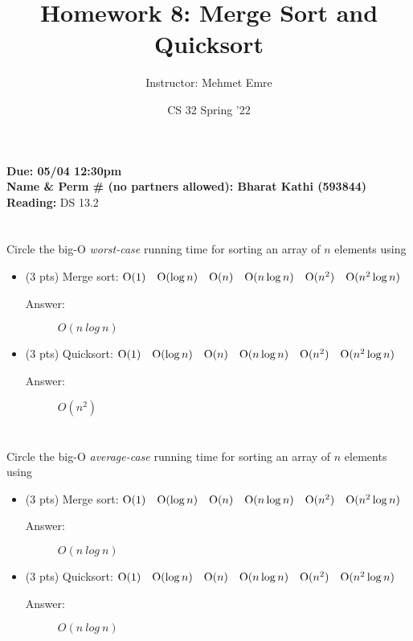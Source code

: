 \documentclass[11pt]{article}
\author{Instructor: Mehmet Emre}
\date{CS 32 Spring '22}
\title{Homework 8: Merge Sort and Quicksort}
\begin{document}
\maketitle
\textbf{Due: 05/04 12:30pm} \\ 
\vspace{1em}
\textbf{Name \& Perm \# (no partners allowed): Bharat Kathi (593844)} \\ 
\vspace{1em}
\textbf{Reading:} DS 13.2

\section{}
\label{sec:org453d831}
Circle the big-O \emph{worst-case} running time for sorting an array of \(n\)
elements using
\begin{itemize}
\item (3 pts) Merge sort: \(\mathrm{O}(1) \quad \mathrm{O}(\log n) \quad \mathrm{O}(n) \quad \mathrm{O}(n \log n) \quad \mathrm{O}(n^2) \quad \mathrm{O}(n^2 \log n)\)
\begin{description}
    \item[Answer:] $O(n~log~n)$
\end{description}
\item (3 pts) Quicksort: \(\mathrm{O}(1) \quad \mathrm{O}(\log n) \quad \mathrm{O}(n) \quad \mathrm{O}(n \log n) \quad \mathrm{O}(n^2) \quad \mathrm{O}(n^2 \log n)\)
\begin{description}
    \item[Answer:] $O(n^2)$
\end{description}
\end{itemize}

\section{}
\label{sec:org92dd408}
Circle the big-O \emph{average-case} running time for sorting an array of \(n\)
elements using
\begin{itemize}
\item (3 pts) Merge sort: \(\mathrm{O}(1) \quad \mathrm{O}(\log n) \quad \mathrm{O}(n) \quad \mathrm{O}(n \log n) \quad \mathrm{O}(n^2) \quad \mathrm{O}(n^2 \log n)\)
\begin{description}
    \item[Answer:] $O(n~log~n)$
\end{description}
\item (3 pts) Quicksort: \(\mathrm{O}(1) \quad \mathrm{O}(\log n) \quad \mathrm{O}(n) \quad \mathrm{O}(n \log n) \quad \mathrm{O}(n^2) \quad \mathrm{O}(n^2 \log n)\)
\begin{description}
    \item[Answer:] $O(n~log~n)$
\end{description}
\newpage
\end{itemize}
\end{document}
